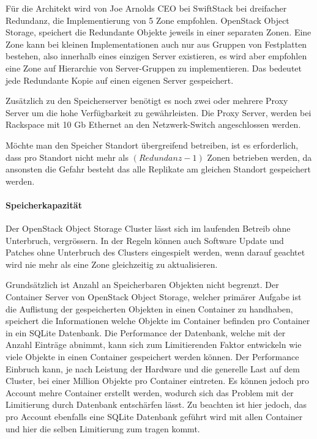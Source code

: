 Für die Architekt wird von Joe Arnolds CEO bei SwiftStack bei dreifacher Redundanz, die Implementierung von 5 Zone empfohlen. OpenStack Object Storage, speichert die Redundante Objekte jeweils in einer separaten Zonen. Eine Zone kann bei kleinen Implementationen auch nur aus Gruppen von Festplatten bestehen, also innerhalb eines einzigen Server existieren, es wird aber empfohlen eine Zone auf Hierarchie von Server-Gruppen zu implementieren. Das bedeutet jede Redundante Kopie auf einen eigenen Server gespeichert. \cite{Arnold} 

Zusätzlich zu den Speicherserver benötigt es noch zwei oder mehrere Proxy Server um die hohe Verfügbarkeit zu gewährleisten. Die Proxy Server, werden bei Rackspace mit 10 Gb Ethernet an den Netzwerk-Switch angeschlossen werden. \cite{OpenStack2011}

Möchte man den Speicher Standort übergreifend betreiben, ist es erforderlich, dass pro Standort nicht mehr als $(Redundanz -1)$ Zonen betrieben werden, da ansonsten die Gefahr besteht das alle Replikate am gleichen Standort gespeichert werden.

\paragraph*{Speicherkapazität}
Der OpenStack Object Storage Cluster lässt sich im laufenden Betreib ohne Unterbruch, vergrössern. In der Regeln können auch Software Update und Patches ohne Unterbruch des Clusters eingespielt werden, wenn darauf geachtet wird nie mehr als eine Zone gleichzeitig zu aktualisieren.

Grundsätzlich ist Anzahl an Speicherbaren Objekten nicht begrenzt. Der Container Server von OpenStack Object Storage, welcher primärer Aufgabe ist die Auflistung der gespeicherten Objekten in einen Container zu handhaben, speichert die Informationen welche Objekte im Container befinden pro Container in ein SQLite Datenbank. Die Performance der Datenbank, welche mit der Anzahl Einträge abnimmt, kann sich zum Limitierenden Faktor entwickeln wie viele Objekte in einen Container gespeichert werden können. Der Performance Einbruch kann, je nach Leistung der Hardware und die generelle Last auf dem Cluster, bei einer Million Objekte pro Container eintreten. Es können jedoch pro Account mehre Container erstellt werden, wodurch sich das Problem mit der Limitierung durch Datenbank entschärfen lässt. Zu beachten ist hier jedoch, das pro Account ebenfalls eine SQLite Datenbank geführt wird mit allen Container und hier die selben Limitierung zum tragen kommt. \cite{OpenStack2012}\cite{A2011}

